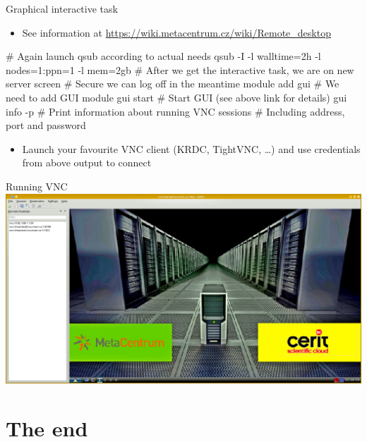 \documentclass[hyperref={bookmarks=true, unicode=true, colorlinks=true, pdftitle={Linux, command line and MetaCentrum}, plainpages=false, pdfauthor={Vojtech Zeisek}, pdfsubject={Course about use of Linux command line, writing shell scripts and using MetaCentrum of CESNET}, pdfcreator={XeLaTeX, http://www.xelatex.org/}, pdfkeywords={Linux, GNU, BASH, shell, command line, MetaCentrum}, linkcolor=Sienna, anchorcolor=black, citecolor=green, filecolor=magenta, menucolor=Sienna, urlcolor=cyan, pdftex}, compress, ucs, xelatex, xcolor=svgnames, 11pt]{beamer}
\begin{document}
\begin{frame}[fragile]{Graphical interactive task}
\begin{itemize}
  \item See information at \href{https://wiki.metacentrum.cz/wiki/Remote_desktop}{https://wiki.metacentrum.cz/wiki/Remote\_desktop}
\end{itemize}
  \begin{bashcode}
    # Again launch qsub according to actual needs
    qsub -I -l walltime=2h -l nodes=1:ppn=1 -l mem=2gb
    # After we get the interactive task, we are on new server
    screen # Secure we can log off in the meantime
    module add gui # We need to add GUI module
    gui start # Start GUI (see above link for details)
    gui info -p # Print information about running VNC sessions
                # Including address, port and password
  \end{bashcode}
\begin{itemize}
  \item Launch your favourite VNC client (KRDC, TightVNC, \ldots) and use credentials from above output to connect
\end{itemize}
\end{frame}

\begin{frame}{Running VNC}
\includegraphics[width=\textwidth]{vnc.png}
\end{frame}

\section{The end}
\end{document}
